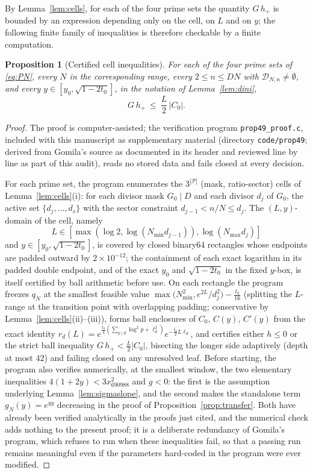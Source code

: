 \documentclass[11pt]{article}
\newtheorem{proposition}[theorem]{Proposition}
\theoremstyle{definition}
\newcommand{\calP}{\mathcal{P}}
\begin{document}
By Lemma~\ref{lem:cells}, for each of the four prime sets the
quantity $G\,h_+$ is bounded by an expression depending only on the
cell, on $L$ and on $y$; the following finite family of
inequalities is therefore checkable by a finite computation.

\begin{proposition}[Certified cell inequalities]\label{prop:dinicells}
For each of the four prime sets of \eqref{eq:PN}, every $N$ in the
corresponding range, every $2\le n\le DN$ with
$\mathcal D_{N,n}\neq\emptyset$, and every
$y\in[y_0,\sqrt{1-2t_0}]$, in the notation of
Lemma~\ref{lem:dini},
\[
G\,h_+\ \le\ \frac L2\,|C_0| .
\]
\end{proposition}

\begin{proof}
The proof is computer-assisted; the verification program
\texttt{prop49\_proof.c}, included with this manuscript as
supplementary material (directory \texttt{code/prop49}; derived
from Gomila's source as documented in its header and reviewed line
by line as part of this audit), reads no stored data and fails
closed at every decision.

For each prime set, the program enumerates the $3^{|\calP|}$
(mask, ratio-sector) cells of Lemma~\ref{lem:cells}(i): for each
divisor mask $G_0\mid D$ and each divisor $d_j$ of $G_0$, the
active set $\{d_j,\dots,d_s\}$ with the sector constraint
$d_{j-1}<n/N\le d_j$. The $(L,y)$-domain of the cell, namely
$$L\in[\max(\log2,\log(N_{\min}d_{j-1})),\log(N_{\max}d_j)]$$ and
$y\in[y_0,\sqrt{1-2t_0}]$, is covered by closed binary64
rectangles whose endpoints are padded outward by $2\times10^{-12}$;
the containment of each exact logarithm in its padded double
endpoint, and of the exact $y_0$ and $\sqrt{1-2t_0}$ in the fixed
$y$-box, is itself certified by ball arithmetic before use. On
each rectangle the program freezes $q_N$ at the smallest feasible
value $\max\bigl(N_{\min}^2,e^{2L}/d_j^2\bigr)-\frac{t_0}{16}$
(splitting the $L$-range at the transition point with overlapping
padding; conservative by Lemma~\ref{lem:cells}(ii)--(iii)), forms
ball enclosures of $C_0$, $C(y)$, $C'(y)$ from the exact identity
$r_d(L)=e^{\frac{t_0}4(\sum_{p\mid d}\log^2p+\ell_d^2)}
e^{-\frac{t_0}2L\ell_d}$, and certifies either
$h\le0$ or the strict ball inequality $G\,h_+<\frac L2|C_0|$,
bisecting the longer side adaptively (depth at most $42$) and
failing closed on any unresolved leaf. Before starting, the program also verifies numerically, at the
smallest window, the two elementary inequalities
$4(1+2y)<3x_{690988}^2$ and $g<0$: the first is the assumption
underlying Lemma~\ref{lem:sigmaslope}, and the second makes the
standalone term $g_N(y)=e^{yg}$ decreasing in the proof of
Proposition~\ref{prop:transfer}. Both have already been verified
analytically in the proofs just cited, and the numerical check adds
nothing to the present proof; it is a deliberate redundancy of
Gomila's program, which refuses to run when these inequalities
fail, so that a passing run remains meaningful even if the
parameters hard-coded in the program were ever modified.


\end{proof}
\end{document}
